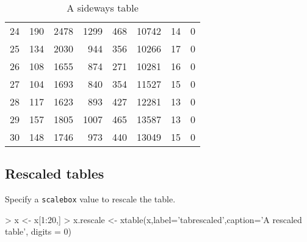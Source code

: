 \documentclass[letterpaper]{article}
\begin{document}
\begin{Schunk}
\begin{sidewaystable}[ht]
\begin{tabular}{rrrrrrrr}
  24 & 190 & 2478 & 1299 & 468 & 10742 & 14 & 0 \\ 
  25 & 134 & 2030 & 944 & 356 & 10266 & 17 & 0 \\ 
  26 & 108 & 1655 & 874 & 271 & 10281 & 16 & 0 \\ 
  27 & 104 & 1693 & 840 & 354 & 11527 & 15 & 0 \\ 
  28 & 117 & 1623 & 893 & 427 & 12281 & 13 & 0 \\ 
  29 & 157 & 1805 & 1007 & 465 & 13587 & 13 & 0 \\ 
  30 & 148 & 1746 & 973 & 440 & 13049 & 15 & 0 \\ 
   \hline
\end{tabular}
\caption{A sideways table} 
\label{tabsmall}
\end{sidewaystable}\end{Schunk}
\clearpage

\subsection{Rescaled tables}
Specify a {\tt scalebox} value to rescale the table.

\begin{Schunk}
\begin{Sinput}
> x <- x[1:20,]
> x.rescale <- xtable(x,label='tabrescaled',caption='A rescaled table', digits = 0)
\end{Sinput}
\end{Schunk}
\end{document}
